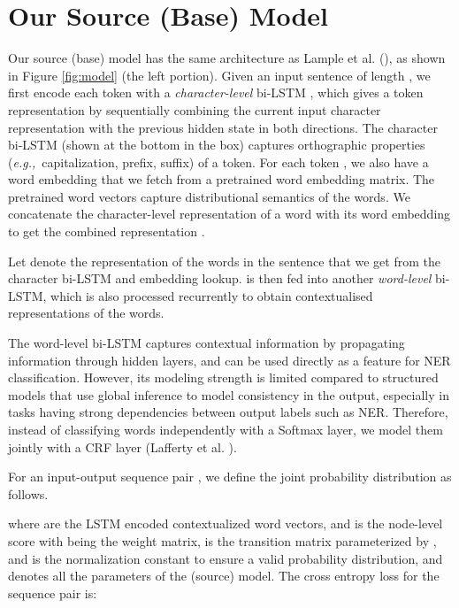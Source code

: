 \documentclass[letterpaper]{article} \usepackage{aaai20}  \usepackage{times}  \usepackage{helvet} \usepackage{courier}  \usepackage[hyphens]{url}  \usepackage{graphicx} \urlstyle{rm} \def\UrlFont{\rm}  \usepackage{graphicx}  \frenchspacing  \setlength{\pdfpagewidth}{8.5in}  \setlength{\pdfpageheight}{11in}
\newcommand{\eg}{{\em e.g.,}\xspace}
\begin{document}
\section{Our Source (Base) Model} \label{subsec:base}

Our source (base) model has the same architecture as Lample et al. (\citeyear{lampleNER}), as shown in Figure \ref{fig:model} (the left portion). Given an input sentence  of length , we first encode each token  with a \emph{character-level} bi-LSTM \cite{hochreiter1997long}, which gives a token representation  by sequentially combining the current input character representation with the previous hidden state in both directions. The character bi-LSTM (shown at the bottom in the box) captures orthographic properties (\eg\ capitalization, prefix, suffix) of a token. For each token , we also have a word embedding  that we fetch from a pretrained word embedding matrix. The pretrained word vectors capture distributional semantics of the words. We concatenate the character-level representation of a word with its word embedding to get the combined representation  .  

  
     
Let  denote the representation of the words in the sentence that we get from the character bi-LSTM and embedding lookup.  is then fed into another \emph{word-level} bi-LSTM, which is also processed recurrently to obtain contextualised representations of the words. 


The word-level bi-LSTM captures contextual information by propagating information through hidden layers, and can be used directly as a feature for NER classification. However, its modeling strength is limited compared to structured models that use global inference to model consistency in the output, especially in tasks having strong dependencies between output labels such as NER. Therefore, instead of classifying words independently with a Softmax layer, we model them jointly with a CRF layer (Lafferty et al. \citeyear{Lafferty01}). 



For an input-output sequence pair , we define the joint probability distribution as follows. 

\normalsize
\noindent where  are the LSTM encoded contextualized word vectors, and  is the node-level score with  being the weight matrix,  is the transition matrix parameterized by , and  is the normalization constant to ensure a valid probability distribution, and  denotes all the parameters of the (source) model. The cross entropy loss for the  sequence pair is:
\end{document}
